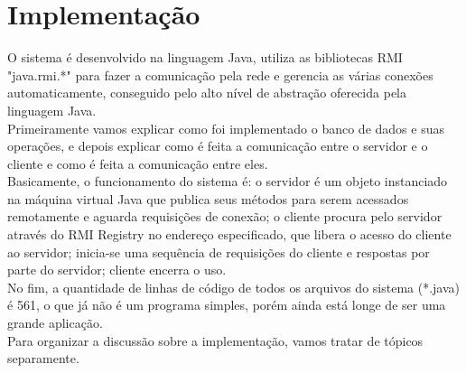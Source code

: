 \documentclass[11pt,twoside]{article}
\begin{document}
\section{Implementação}
O sistema é desenvolvido na linguagem Java, utiliza as bibliotecas RMI "java.rmi.*" para fazer a comunicação pela rede e gerencia as várias conexões automaticamente, conseguido pelo alto nível de abstração oferecida pela linguagem Java.\\
Primeiramente vamos explicar como foi implementado o banco de dados e suas operações, e depois explicar como é feita a comunicação entre o servidor e o cliente e como é feita a comunicação entre eles.\\
Basicamente, o funcionamento do sistema é: o servidor é um objeto instanciado na máquina virtual Java que publica seus métodos para serem acessados remotamente e aguarda requisições de conexão; o cliente procura pelo servidor através do RMI Registry no endereço especificado, que libera o acesso do cliente ao servidor; inicia-se uma sequência de requisições do cliente e respostas por parte do servidor; cliente encerra o uso.\\

No fim, a quantidade de linhas de código de todos os arquivos do sistema (*.java) é 561, o que já não é um programa simples, porém ainda está longe de ser uma grande aplicação.\\

Para organizar a discussão sobre a implementação, vamos tratar de tópicos separamente.\\
\end{document}

